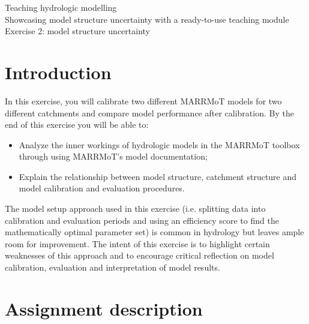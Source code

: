 \documentclass[12pt]{article}
\begin{document}

\begin{center}
Teaching hydrologic modelling\\
Showcasing model structure uncertainty with a ready-to-use teaching module \\
\vspace*{3mm}
Exercise 2: model structure uncertainty\\
\end{center}

\bigskip


\section{Introduction}

In this exercise, you will calibrate two different MARRMoT models for two different catchments and compare model performance after calibration. By the end of this exercise you will be able to:

\begin{itemize}
	\item Analyze the inner workings of hydrologic models in the MARRMoT toolbox through using MARRMoT’s model documentation;
    \item Explain the relationship between model structure, catchment structure and model calibration and evaluation procedures.
\end{itemize}

\noindent
The model setup approach used in this exercise (i.e. splitting data into calibration and evaluation periods and using an efficiency score to find the mathematically optimal parameter set) is common in hydrology but leaves ample room for improvement. The intent of this exercise is to highlight certain weaknesses of this approach and to encourage critical reflection on model calibration, evaluation and interpretation of model results.


\section{Assignment description}
\end{document}
